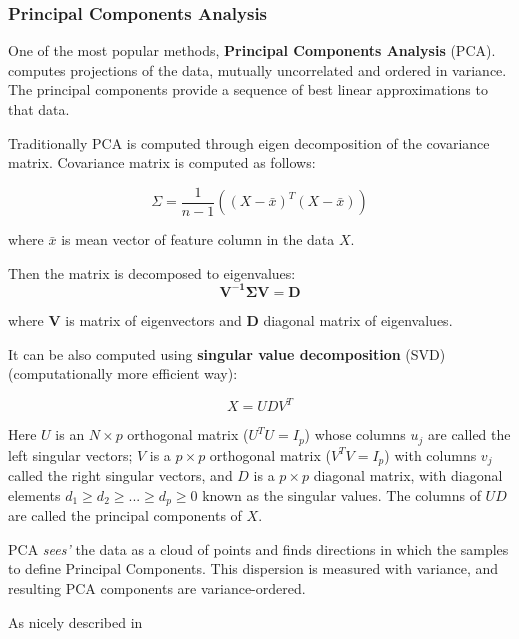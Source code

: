 \documentclass[12pt,]{book}
\theoremstyle{definition}
\theoremstyle{definition}
\theoremstyle{definition}
\theoremstyle{remark}
\begin{document}
\hypertarget{principal-components-analysis}{%
\subsubsection{Principal Components
Analysis}\label{principal-components-analysis}}

One of the most popular methods, \textbf{Principal Components Analysis}
(PCA). computes projections of the data, mutually uncorrelated and
ordered in variance. The principal components provide a sequence of best
linear approximations to that data.

Traditionally PCA is computed through eigen decomposition of the
covariance matrix. Covariance matrix is computed as follows:

\begin{equation}
\Sigma = \frac{1}{n-1}((X-\bar{x})^T(X-\bar{x})) \label{eq:covPCA}
\end{equation}

where \(\bar{x}\) is mean vector of feature column in the data \(X\).

Then the matrix is decomposed to eigenvalues: \begin{equation}
\mathbf{V^{-1}\Sigma V=D} \label{eq:eigenvecPCA}
\end{equation}

where \(\mathbf{V}\) is matrix of eigenvectors and \(\mathbf{D}\)
diagonal matrix of eigenvalues.

It can be also computed using \textbf{singular value decomposition}
(SVD) (computationally more efficient way):

\begin{equation}
X= UDV^T \label{eq:svd}
\end{equation}

Here \(U\) is an \(N \times p\) orthogonal matrix (\(U^T U = I_p\))
whose columns \(u_j\) are called the left singular vectors; \(V\) is a
\(p \times p\) orthogonal matrix (\(V^T V = I_p\)) with columns \(v_j\)
called the right singular vectors, and \(D\) is a \(p \times p\)
diagonal matrix, with diagonal elements
\(d_1 \geq d_2 \geq ... \geq d_p \geq 0\) known as the singular values.
The columns of \(UD\) are called the principal components of \(X\).

PCA \emph{sees'} the data as a cloud of points and finds directions in
which the samples to define Principal Components. This dispersion is
measured with variance, and resulting PCA components are
variance-ordered.

As nicely described in \citep{Rutledge2013}
\end{document}

